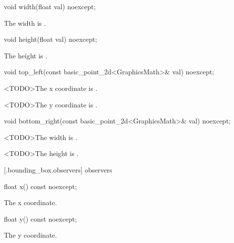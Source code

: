 %
\begin{itemdecl}
void width(float val) noexcept;
\end{itemdecl}
\begin{itemdescr}
\pnum
\effects
The width is .
\end{itemdescr}

%
\begin{itemdecl}
void height(float val) noexcept;
\end{itemdecl}
\begin{itemdescr}
\pnum
\effects
The height is .
\end{itemdescr}

%
\begin{itemdecl}
void top_left(const basic_point_2d<GraphicsMath>& val) noexcept;
\end{itemdecl}
\begin{itemdescr}
\pnum
\effects
<TODO>The x coordinate is .

\pnum
<TODO>The y coordinate is .
\end{itemdescr}

%
\begin{itemdecl}
void bottom_right(const basic_point_2d<GraphicsMath>& val) noexcept;
\end{itemdecl}
\begin{itemdescr}
\pnum
\effects
<TODO>The width is .

\pnum
<TODO>The height is .
\end{itemdescr}

 [\iotwod.bounding_box.observers]{ observers}

%
\begin{itemdecl}
float x() const noexcept;
\end{itemdecl}
\begin{itemdescr}
\pnum
\returns
The x coordinate.
\end{itemdescr}

%
\begin{itemdecl}
float y() const noexcept;
\end{itemdecl}
\begin{itemdescr}
\pnum
\returns
The y coordinate.
\end{itemdescr}

